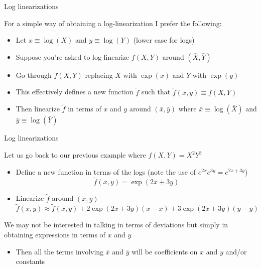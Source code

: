 

\begin{frame}{Log linearizations}

For a simple way of obtaining a log-linearization I prefer the following:
\begin{itemize}
\item	Let $x\equiv\log{(X)}$ and $y\equiv\log{(Y)}$ (lower case for logs)
\item	Suppose you're asked to log-linearize $f(X,Y)$ around $(\bar{X},\bar{Y})$
\item	Go through $f(X,Y)$ replacing $X$ with $\exp{(x)}$ and $Y$ with $\exp{(y)}$
\item	This effectively defines a new function $\tilde{f}$ such that $\tilde{f}(x,y)\equiv f(X,Y)$
\item	Then linearize $\tilde{f}$ in terms of $x$ and $y$ around $(\bar{x},\bar{y})$ where $\bar{x}\equiv\log{(\bar{X})}$ and $\bar{y}\equiv\log{(\bar{Y})}$
\end{itemize}

\end{frame}



\begin{frame}{Log linearizations}

Let us go back to our previous example where $f(X,Y)=X^{2}Y^{3}$
\begin{itemize}
\item	Define a new function in terms of the logs (note the use of $e^{2x}e^{3y}=e^{2x+3y}$)
\[
\tilde{f}(x,y) = \exp{(2x + 3y)}
\]
\item	Linearize $\tilde{f}$ around $(\bar{x},\bar{y})$
\[
\tilde{f}(x,y) \approx \tilde{f}(\bar{x},\bar{y}) + 2 \exp{(2\bar{x} + 3\bar{y})}(x-\bar{x}) + 3 \exp{(2\bar{x} + 3\bar{y})}(y-\bar{y})
\]
\end{itemize}


\vspace{2mm}
We may not be interested in talking in terms of deviations but simply in obtaining expressions in terms of $x$ and $y$
\begin{itemize}
\item	Then all the terms involving $\bar{x}$ and $\bar{y}$ will be coefficients on $x$ and $y$ and/or constants
\end{itemize}

\end{frame}

